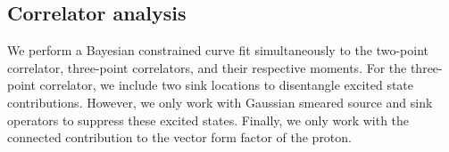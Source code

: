 \documentclass{PoS}
\begin{document}

\subsection{Correlator analysis}
We perform a Bayesian constrained curve fit simultaneously to the two-point correlator, three-point correlators, and their respective moments. For the three-point correlator, we include two sink locations to disentangle excited state contributions. However, we only work with Gaussian smeared source and sink operators to suppress these excited states. Finally, we only work with the connected contribution to the vector form factor of the proton.
\end{document}
